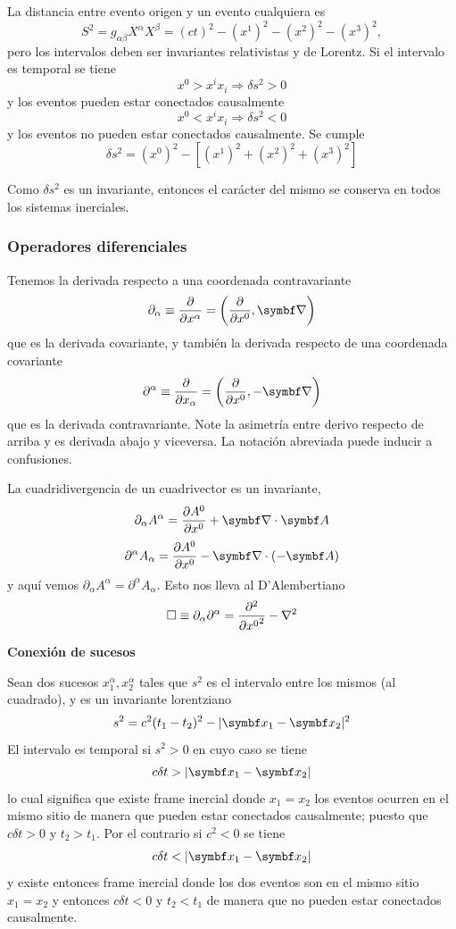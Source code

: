\documentclass[10pt,oneside]{CBFT_book}
\begin{document}
La distancia entre evento origen y un evento cualquiera es
\[
	S^2 = g_{\alpha\beta} X^\alpha X^\beta = (ct)^2 - (x^1)^2 - (x^2)^2 - (x^3)^2,
\]
pero los intervalos deben ser invariantes relativistas y de Lorentz.
Si el intervalo es temporal se tiene 
\[
	x^0 > x^i x_i \Rightarrow \delta s^2 > 0  
\]
y los eventos pueden estar conectados causalmente
\[
	x^0 < x^i x_i \Rightarrow \delta s^2 < 0 
\]
y los eventos no pueden estar conectados causalmente. Se cumple
\[
	\delta s^2 = (x^0)^2 - [ (x^1)^2 + (x^2)^2 + (x^3)^2 ]
\]

Como $\delta s^2$ es un invariante, entonces el carácter del mismo se conserva en todos
los sistemas inerciales.

\subsubsection{Operadores diferenciales}

Tenemos la derivada respecto a una coordenada contravariante
\[
	\partial_\alpha \equiv \dpar{}{x^\alpha} = \left( \dpar{}{x^0}, \Nabla \right)
\]
que es la derivada covariante, y también la derivada respecto de una coordenada covariante
\[
	\partial^\alpha \equiv \dpar{}{x_\alpha} = \left( \dpar{}{x^0}, - \Nabla \right)
\]
que es la derivada contravariante. Note la asimetría entre derivo respecto de arriba y es derivada abajo
y viceversa. La notación abreviada puede inducir a confusiones.

La cuadridivergencia de un cuadrivector es un invariante,
\[
	\partial_\alpha A^\alpha = \dpar{A^0}{x^0} + \Nabla\cdot\vb{A}
\]
\[
	\partial^\alpha A_\alpha = \dpar{A^0}{x^0} - \Nabla\cdot(-\vb{A})
\]
y aquí vemos $\partial_\alpha A^\alpha = \partial^\alpha A_\alpha$. Esto nos lleva al D'Alembertiano
\[
	\Box \equiv \partial_\alpha \partial^\alpha = \dpar[2]{}{x^0} - \nabla^2
\]

{\bf Conexión de sucesos}

Sean dos sucesos $x_1^\alpha, x_2^\alpha$ tales que 
$s^2$ es el intervalo entre los mismos (al cuadrado), y es un invariante lorentziano
\[
	s^2 = c^2( t_1 - t_2 )^2 - | \vb{x}_1 - \vb{x}_2 |^2
\]
El intervalo es temporal si $s^2 >0$ en cuyo caso se tiene 
\[
	c \delta t >  | \vb{x}_1 - \vb{x}_2 |
\]
lo cual significa que existe frame inercial donde $x_1=x_2$ los eventos ocurren en el mismo sitio de manera
que pueden estar conectados causalmente; puesto que $c\delta t > 0$ y $t_2>t_1$. Por el contrario si 
$c^2 < 0$ se tiene 
\[
	c \delta t <  | \vb{x}_1 - \vb{x}_2 |
\]
y existe entonces frame inercial donde los dos eventos son en el mismo sitio $x_1=x_2$ y entonces $c\delta t 
< 0$ y $t_2 < t_1$ de manera que no pueden estar conectados causalmente.
\end{document}
